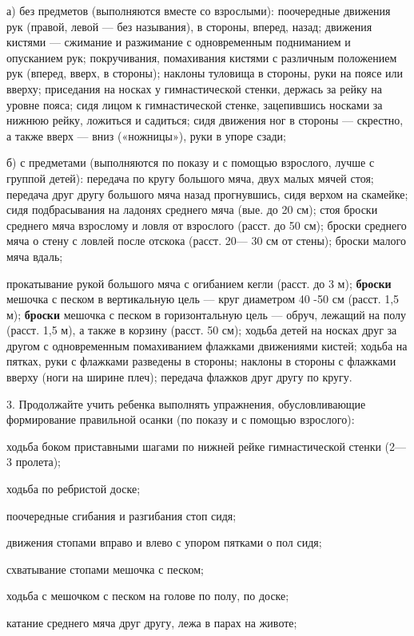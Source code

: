 \documentclass[a5paper]{book}
\begin{document}
а) без предметов (выполняются вместе со взрослыми): поочередные движения
рук (правой, левой --- без называния), в стороны, вперед, назад;
движения кистями --- сжимание и разжимание с одновременным подниманием и
опусканием рук; покручивания, помахивания кистями с различным положением
рук (вперед, вверх, в стороны); наклоны туловища в стороны, руки на
поясе или вверху; приседания на носках у гимнастической стенки, держась
за рейку на уровне пояса; сидя лицом к гимнастической стенке,
зацепившись носками за нижнюю рейку, ложиться и садиться; сидя движения
ног в стороны --- скрестно, а также вверх --- вниз («ножницы»), руки в
упоре сзади;

б) с предметами (выполняются по показу и с помощью взрослого, лучше с
группой детей): передача по кругу большого мяча, двух малых мячей стоя;
передача друг другу большого мяча назад прогнувшись, сидя верхом на
скамейке; сидя подбрасывания на ладонях среднего мяча (вые. до 20 см);
стоя броски среднего мяча взрослому и ловля от взрослого (расст. до 50
см); броски среднего мяча о стену с ловлей после отскока (расст. 20---
30 см от стены); броски малого мяча вдаль;

прокатывание рукой большого мяча с огибанием кегли (расст. до 3 м);
\textbf{броски} мешочка с песком в вертикальную цель --- круг диаметром
40 -50 см (расст. 1,5 м); \textbf{броски} мешочка с песком в
горизонтальную цель --- обруч, лежащий на полу (расст. 1,5 м), а также в
корзину (расст. 50 см); ходьба детей на носках друг за другом с
одновременным помахиванием флажками движениями кистей; ходьба на пятках,
руки с флажками разведены в стороны; наклоны в стороны с флажками вверху
(ноги на ширине плеч); передача флажков друг другу по кругу.

3. Продолжайте учить ребенка выполнять упражнения, обусловливающие
формирование правильной осанки (по показу и с помощью взрослого):

ходьба боком приставными шагами по нижней рейке гимнастической стенки
(2---3 пролета);

ходьба по ребристой доске;

поочередные сгибания и разгибания стоп сидя;

движения стопами вправо и влево с упором пятками о пол сидя;

схватывание стопами мешочка с песком;

ходьба с мешочком с песком на голове по полу, по доске;

катание среднего мяча друг другу, лежа в парах на животе;
\end{document}
